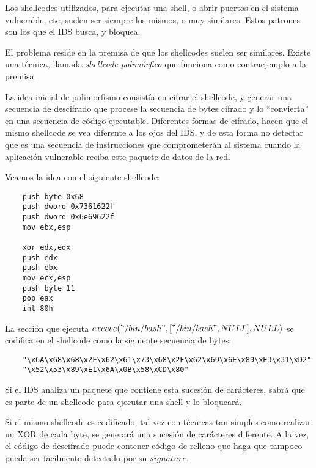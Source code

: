 	Los shellcodes utilizados, para ejecutar una shell, o abrir puertos en el sistema vulnerable, etc, suelen ser siempre los mismos, o muy similares. Estos patrones son los que el IDS busca, y bloquea.
	
	El problema reside en la premisa de que los shellcodes suelen ser similares. Existe una t\'ecnica, llamada {\em shellcode polim\'orfico} que funciona como contraejemplo a la premisa. 
	
	La idea inicial de polimorfismo consist\'ia en cifrar el shellcode, y generar una secuencia de descifrado que procese la secuencia de bytes cifrado y lo ``convierta'' en una secuencia de c\'odigo ejecutable. Diferentes formas de cifrado, hacen que el mismo shellcode se vea diferente a los ojos del IDS, y de esta forma no detectar que es una secuencia de instrucciones que comprometer\'an al sistema cuando la aplicaci\'on vulnerable reciba este paquete de datos de la red.
	
	Veamos la idea con el siguiente shellcode:
	
	\vspace{5 mm}
	
	\begin{lstlisting}
	push byte 0x68
	push dword 0x7361622f
	push dword 0x6e69622f
	mov ebx,esp

	xor edx,edx
	push edx
	push ebx
	mov ecx,esp
	push byte 11
	pop eax
	int 80h
	\end{lstlisting}
	
	\vspace{5 mm}
	
	La secci\'on que ejecuta $execve("/bin/bash",["/bin/bash",NULL],NULL)$ se codifica en el shellcode como la siguiente secuencia de bytes:
	
	\vspace{5 mm}
	
	\begin{lstlisting}
	"\x6A\x68\x68\x2F\x62\x61\x73\x68\x2F\x62\x69\x6E\x89\xE3\x31\xD2"
	"\x52\x53\x89\xE1\x6A\x0B\x58\xCD\x80"
	\end{lstlisting}
	
	\vspace{5 mm}
	
	Si el IDS analiza un paquete que contiene esta sucesi\'on de car\'acteres, sabr\'a que es parte de un shellcode para ejecutar una shell y lo bloquear\'a.
	
	Si el mismo shellcode es codificado, tal vez con t\'ecnicas tan simples como realizar un XOR de cada byte, se generar\'a una sucesi\'on de car\'acteres diferente. A la vez, el c\'odigo de descifrado puede contener c\'odigo de relleno que haga que tampoco pueda ser facilmente detectado por su $signature$.
	
